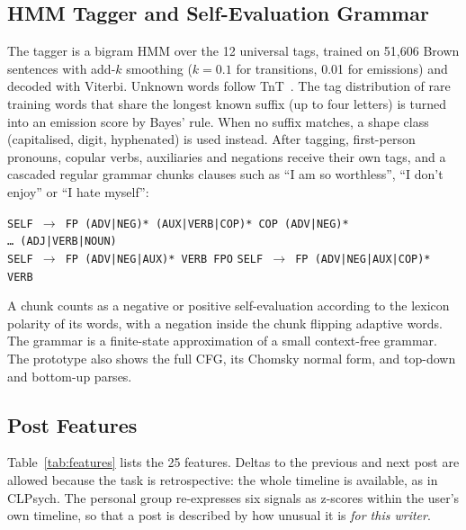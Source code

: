 \documentclass[runningheads]{llncs}
\begin{document}
\subsection{HMM Tagger and Self-Evaluation Grammar}

The tagger is a bigram HMM over the 12 universal tags, trained on 51,606 Brown sentences with add-$k$ smoothing ($k=0.1$ for transitions, 0.01 for emissions) and decoded with Viterbi. Unknown words follow TnT~\cite{brants2000tnt}. The tag distribution of rare training words that share the longest known suffix (up to four letters) is turned into an emission score by Bayes' rule. When no suffix matches, a shape class (capitalised, digit, hyphenated) is used instead. After tagging, first-person pronouns, copular verbs, auxiliaries and negations receive their own tags, and a cascaded regular grammar chunks clauses such as ``I am so worthless'', ``I don't enjoy'' or ``I hate myself'':
\begin{center}\small
\texttt{SELF $\rightarrow$ FP (ADV|NEG)* (AUX|VERB|COP)* COP (ADV|NEG)* \dots\ (ADJ|VERB|NOUN)}\\
\texttt{SELF $\rightarrow$ FP (ADV|NEG|AUX)* VERB FPO} \qquad \texttt{SELF $\rightarrow$ FP (ADV|NEG|AUX|COP)* VERB}
\end{center}
A chunk counts as a negative or positive self-evaluation according to the lexicon polarity of its words, with a negation inside the chunk flipping adaptive words. The grammar is a finite-state approximation of a small context-free grammar. The prototype also shows the full CFG, its Chomsky normal form, and top-down and bottom-up parses.

\subsection{Post Features}

Table~\ref{tab:features} lists the 25 features. Deltas to the previous and next post are allowed because the task is retrospective: the whole timeline is available, as in CLPsych. The personal group re-expresses six signals as z-scores within the user's own timeline, so that a post is described by how unusual it is \emph{for this writer}.
\end{document}

